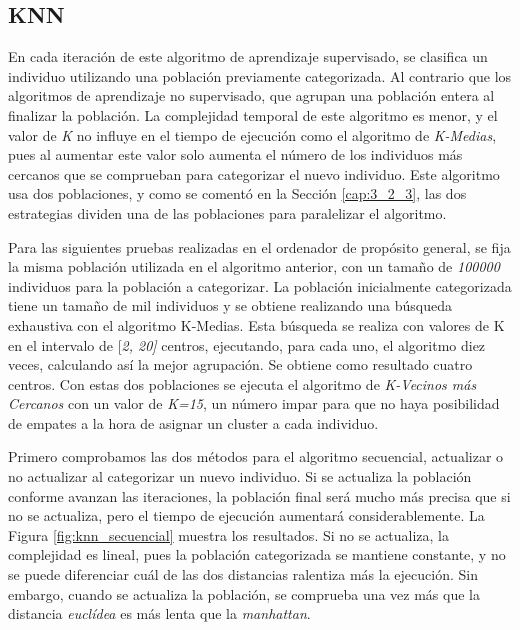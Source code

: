 	\subsection{KNN}


		En cada iteración de este algoritmo de aprendizaje supervisado, se clasifica un individuo utilizando una población previamente categorizada. Al contrario que los algoritmos de aprendizaje no supervisado, que agrupan una población entera al finalizar la población. La complejidad temporal de este algoritmo es menor, y el valor de \textit{K} no influye en el tiempo de ejecución como el algoritmo de \textit{K-Medias}, pues al aumentar este valor solo aumenta el número de los individuos más cercanos que se comprueban para categorizar el nuevo individuo. Este algoritmo usa dos poblaciones, y como se comentó en la Sección \ref{cap:3_2_3}, las dos estrategias dividen una de las poblaciones para paralelizar el algoritmo. 
		
			Para las siguientes pruebas realizadas en el ordenador de propósito general, se fija la misma población utilizada en el algoritmo anterior, con un tamaño de \textit{100000} individuos para la población a categorizar. La población inicialmente categorizada tiene un tamaño de mil individuos y se obtiene realizando una búsqueda exhaustiva con el algoritmo K-Medias. Esta búsqueda se realiza con valores de K en el intervalo de [\textit{2, 20]} centros, ejecutando, para cada uno, el algoritmo diez veces, calculando así la mejor agrupación. Se obtiene como resultado cuatro centros. Con estas dos poblaciones se ejecuta el algoritmo de \textit{K-Vecinos más Cercanos} con un valor de \textit{K=15}, un número impar para que no haya posibilidad de empates a la hora de asignar un cluster a cada individuo.
			
		
			Primero comprobamos las dos métodos para el algoritmo secuencial, actualizar o no actualizar al categorizar un nuevo individuo. Si se actualiza la población conforme avanzan las iteraciones, la población final será mucho más precisa que si no se actualiza, pero el tiempo de ejecución aumentará considerablemente. La Figura \ref{fig:knn_secuencial} muestra los resultados. Si no se actualiza, la complejidad es lineal, pues la población categorizada se mantiene constante, y no se puede diferenciar cuál de las dos distancias ralentiza más la ejecución. Sin embargo, cuando se actualiza la población, se comprueba una vez más que la distancia \textit{euclídea} es más lenta que la \textit{manhattan}.
			

